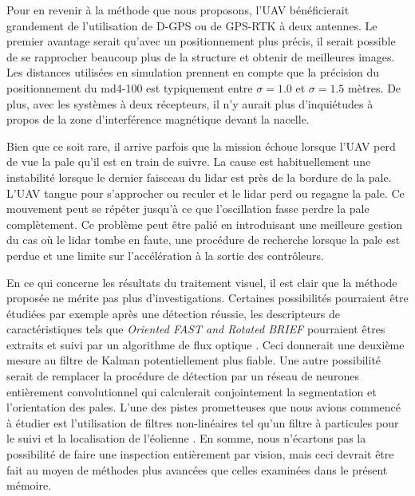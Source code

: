 Pour en revenir à la méthode que nous proposons, l'UAV bénéficierait grandement de l'utilisation de D-GPS ou de GPS-RTK à deux antennes. Le premier avantage serait qu’avec un positionnement plus précis, il serait possible de se rapprocher beaucoup plus de la structure et obtenir de meilleures images. Les distances utilisées en simulation prennent en compte que la précision du positionnement du md4-100 est typiquement entre $\sigma = 1.0$ et $\sigma = 1.5$ mètres. De plus, avec les systèmes à deux récepteurs, il n'y aurait plus d'inquiétudes à propos de la zone d'interférence magnétique devant la nacelle.

Bien que ce soit rare, il arrive parfois que la mission échoue lorsque l'UAV perd de vue la pale qu'il est en train de suivre. La cause est habituellement une instabilité lorsque le dernier faisceau du lidar est près de la bordure de la pale. L'UAV tangue pour s'approcher ou reculer et le lidar perd ou regagne la pale. Ce mouvement peut se répéter jusqu'à ce que l'oscillation fasse perdre la pale complètement. Ce problème peut être palié en introduisant une meilleure gestion du cas où le lidar tombe en faute, une procédure de recherche lorsque la pale est perdue et une limite sur l'accélération à la sortie des contrôleurs.

En ce qui concerne les résultats du traitement visuel, il est clair que la méthode proposée ne mérite pas plus d'investigations. Certaines possibilités pourraient être étudiées par exemple après une détection réussie, les descripteurs de caractéristiques tels que \textit{Oriented FAST and Rotated BRIEF} \citep{Rublee2011} pourraient êtres extraits et suivi par un algorithme de flux optique \citep{Lucas1981}. Ceci donnerait une deuxième mesure au filtre de Kalman potentiellement plus fiable. Une autre possibilité serait de remplacer la procédure de détection par un réseau de neurones entièrement convolutionnel qui calculerait conjointement la segmentation et l'orientation des pales. L'une des pistes prometteuses que nous avions commencé à étudier est l'utilisation de filtres non-linéaires tel qu'un filtre à particules pour le suivi et la localisation de l'éolienne \citep{Sugandi2009}. En somme, nous n'écartons pas la possibilité de faire une inspection entièrement par vision, mais ceci devrait être fait au moyen de méthodes plus avancées que celles examinées dans le présent mémoire.

